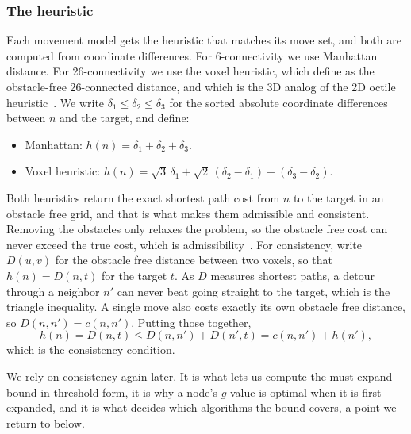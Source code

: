 \documentclass[letterpaper]{article} %
\begin{document}
\subsubsection{The heuristic}
Each movement model gets the heuristic that matches its move set, and both are computed from coordinate differences. For 6-connectivity we use Manhattan distance. For 26-connectivity we use the voxel heuristic, which \citet{nobes2023voxel} define as the obstacle-free 26-connected distance, and which is the 3D analog of the 2D octile heuristic~\cite{sturtevant2012benchmarks}. We write $\delta_1 \le \delta_2 \le \delta_3$ for the sorted absolute coordinate differences between $n$ and the target, and define:
\begin{itemize}
  \item Manhattan: $h(n) = \delta_1 + \delta_2 + \delta_3$.
  \item Voxel heuristic: $h(n) = \sqrt{3}\,\delta_1 + \sqrt{2}\,(\delta_2-\delta_1) + (\delta_3-\delta_2)$.
\end{itemize} Both heuristics return the exact shortest path cost from $n$ to the target in an obstacle free grid, and that is what makes them admissible and consistent. Removing the obstacles only relaxes the problem, so the obstacle free cost can never exceed the true cost, which is admissibility~\cite{pearl1984heuristics}. For consistency, write $D(u,v)$ for the obstacle free distance between two voxels, so that $h(n) = D(n,t)$ for the target $t$. As $D$ measures shortest paths, a detour through a neighbor $n'$ can never beat going straight to the target, which is the triangle inequality. A single move also costs exactly its own obstacle free distance, so $D(n,n') = c(n,n')$. Putting those together, \[h(n) = D(n,t) \le D(n,n') + D(n',t) = c(n,n') + h(n'),\] which is the consistency condition.

We rely on consistency again later. It is what lets us compute the must-expand bound in threshold form, it is why a node's $g$ value is optimal when it is first expanded, and it is what decides which algorithms the bound covers, a point we return to below.
\end{document}

